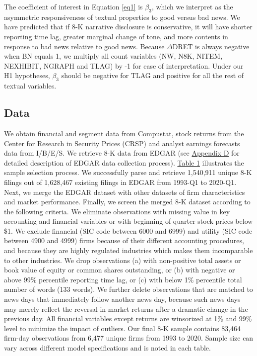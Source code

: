 \documentclass[letterpaper,12pt]{article}
\begin{document}
\begin{spacing}{1.5}
The coefficient of interest in Equation \eqref{eq1} is $\beta_3$, which we interpret as the asymmetric responsiveness of textual properties to good versus bad news. We have predicted that if 8-K narrative disclosure is conservative, it will have shorter reporting time lag, greater marginal change of tone, and more contents in response to bad news relative to good news. Because $\Delta$DRET is always negative when BN equals 1, we multiply all count variables (NW, N8K, NITEM, NEXHIBIT, NGRAPH and TLAG) by -1 for ease of interpretation. Under our H1 hypotheses, $\beta_3$ should be negative for TLAG and positive for all the rest of textual variables.

\subsection{Data}
\noindent We obtain financial and segment data from Compustat, stock returns from the Center for Research in Security Prices (CRSP) and analyst earnings forecasts data from I/B/E/S. We retrieve 8-K data from EDGAR (see \hyperref[appd]{Appendix D} for detailed description of EDGAR data collection process). \hyperref[T1]{Table 1} illustrates the sample selection process. We successfully parse and retrieve 1,540,911 unique 8-K filings out of 1,628,467 existing filings in EDGAR from 1993-Q1 to 2020-Q1. Next, we merge the EDGAR dataset with other datasets of firm characteristics and market performance. Finally, we screen the merged 8-K dataset according to the following criteria. We eliminate observations with missing value in key accounting and financial variables or with beginning-of-quarter stock prices below \$1. We exclude financial (SIC code between 6000 and 6999) and utility (SIC code between 4900 and 4999) firms because of their different accounting procedures, and because they are highly regulated industries which makes them incomparable to other industries. We drop observations (a) with non-positive total assets or book value of equity or common shares outstanding, or (b) with negative or above 99\% percentile reporting time lag, or (c) with below 1\% percentile total number of words (133 words). We further delete observations that are matched to news days that immediately follow another news day, because such news days may merely reflect the reversal in market returns after a dramatic change in the previous day. All financial variables except returns are winsorized at 1\% and 99\% level to minimize the impact of outliers. Our final 8-K sample contains 83,464 firm-day observations from 6,477 unique firms from 1993 to 2020. Sample size can vary across different model specifications and is noted in each table. 


\end{spacing}
\end{document}
